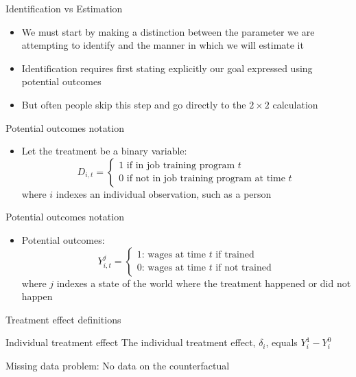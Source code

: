 \documentclass{beamer}
\begin{document}
\begin{frame}{Identification vs Estimation}

\begin{itemize}
\item We must start by making a distinction between the parameter we are attempting to identify and the manner in which we will estimate it
\item Identification requires first stating explicitly our goal expressed using potential outcomes
\item But often people skip this step and go directly to the  $2 \times 2$ calculation

\end{itemize}

\end{frame}






\begin{frame}{Potential outcomes notation}
	
	\begin{itemize}
	\item Let the treatment be a binary variable: $$D_{i,t} =\begin{cases} 1 \text{ if in job training program $t$} \\ 0 \text{ if not in job training program at time $t$} \end{cases}$$where $i$ indexes an individual observation, such as a person

	\end{itemize}
\end{frame}

\begin{frame}{Potential outcomes notation}
	
	\begin{itemize}

	\item Potential outcomes: $$Y_{i,t}^j =\begin{cases} 1 \text{: wages at time $t$ if trained} \\ 0 \text{: wages at time $t$ if not trained} \end{cases}$$where $j$ indexes a state of the world where the treatment happened or did not happen

	\end{itemize}
\end{frame}



\begin{frame}{Treatment effect definitions}


	\begin{block}{Individual treatment effect}
	    The individual treatment effect,  $\delta_i$, equals $Y_i^1-Y_i^0$
	\end{block}

Missing data problem:  No data on the counterfactual 
	
\end{frame}
\end{document}
